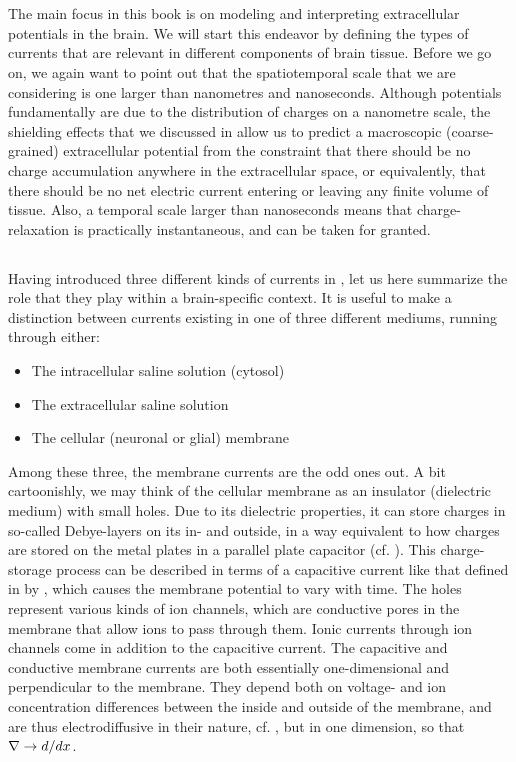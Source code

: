 \section{}
\label{sec:Basics:ECSpot}
The main focus in this book is on modeling and interpreting extracellular potentials in the brain. We will start this endeavor by defining the types of currents that are relevant in different components of brain tissue. Before we go on, we again want to point out that the spatiotemporal scale that we are considering is one larger than nanometres and nanoseconds. Although potentials fundamentally are due to the distribution of charges on a nanometre scale, the shielding effects that we discussed in   allow us to predict a macroscopic (coarse-grained) extracellular potential from the constraint that there should be no charge accumulation anywhere in the extracellular space, or equivalently, that there should be no net electric current entering or leaving any finite volume of tissue. Also, a temporal scale larger than nanoseconds means that charge-relaxation is practically instantaneous, and can be taken for granted. 


\subsection{}
\label{Basics:braincurrents}
Having introduced three different kinds of currents in , let us here summarize the role that they play within a brain-specific context. It is useful to make a distinction between currents existing in one of three different mediums, running through either:
\begin{itemize}
\item The intracellular saline solution (cytosol)
\item The extracellular saline solution
\item The cellular (neuronal or glial) membrane
\end{itemize}

Among these three, the membrane currents are the odd ones out. A bit cartoonishly, we may think of the cellular membrane as an insulator (dielectric medium) with small holes. Due to its dielectric properties, it can store charges in so-called Debye-layers on its in- and outside, in a way equivalent to how charges are stored on the metal plates in a parallel plate capacitor (cf. ). This charge-storage process can be described in terms of a capacitive current like that defined in by , which causes the membrane potential to vary with time. The holes represent various kinds of ion channels, which are conductive pores in the membrane that allow ions to pass through them. Ionic currents through ion channels come in addition to the capacitive current. The capacitive and conductive membrane currents are both essentially one-dimensional and perpendicular to the membrane. They depend both on voltage- and ion concentration differences between the inside and outside of the membrane, and are thus electrodiffusive in their nature, cf. , but in one dimension, so that ${\bf \nabla} \rightarrow d/dx$.


